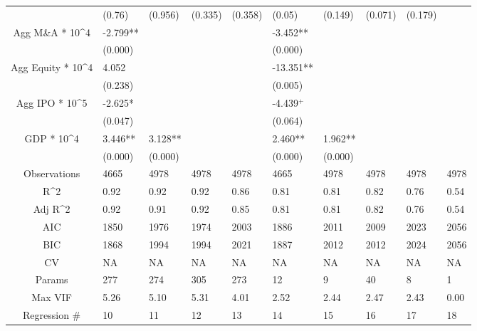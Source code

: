 \documentclass{article}
\begin{document}
\begin{table}[H]
\begin{tabular}{|clllllllll|}
   & (0.76) & (0.956) & (0.335) & (0.358) & (0.05) & (0.149) & (0.071) & (0.179) &  \\
  Agg M\&A * 10^4 & -2.799** &  &  &  & -3.452** &  &  &  &  \\
   & (0.000) &  &  &  & (0.000) &  &  &  &  \\
  Agg Equity * 10^4 & 4.052 &  &  &  & -13.351** &  &  &  &  \\
   & (0.238) &  &  &  & (0.005) &  &  &  &  \\
  Agg IPO * 10^5 & -2.625* &  &  &  & -4.439$^{+}$ &  &  &  &  \\
   & (0.047) &  &  &  & (0.064) &  &  &  &  \\
  GDP * 10^4 & 3.446** & 3.128** &  &  & 2.460** & 1.962** &  &  &  \\
   & (0.000) & (0.000) &  &  & (0.000) & (0.000) &  &  &  \\
  \hline
 Observations & 4665 & 4978 & 4978 & 4978 & 4665 & 4978 & 4978 & 4978 & 4978 \\
  R^2 & 0.92 & 0.92 & 0.92 & 0.86 & 0.81 & 0.81 & 0.82 & 0.76 & 0.54 \\
  Adj R^2 & 0.92 & 0.91 & 0.92 & 0.85 & 0.81 & 0.81 & 0.82 & 0.76 & 0.54 \\
  AIC & 1850 & 1976 & 1974 & 2003 & 1886 & 2011 & 2009 & 2023 & 2056 \\
  BIC & 1868 & 1994 & 1994 & 2021 & 1887 & 2012 & 2012 & 2024 & 2056 \\
  CV & NA & NA & NA & NA & NA & NA & NA & NA & NA \\
  Params & 277 & 274 & 305 & 273 & 12 & 9 & 40 & 8 & 1 \\
  Max VIF & 5.26 & 5.10 & 5.31 & 4.01 & 2.52 & 2.44 & 2.47 & 2.43 & 0.00 \\
  Regression \# & 10 & 11 & 12 & 13 & 14 & 15 & 16 & 17 & 18 \\
   \hline
\end{tabular}

\end{table}
\end{document}
